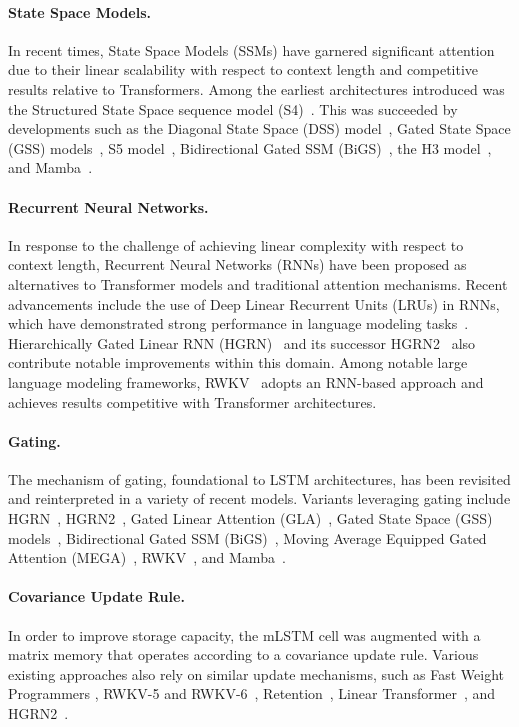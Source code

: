 \paragraph{State Space Models.} In recent times, State Space Models (SSMs) have garnered significant attention due to their linear scalability with respect to context length and competitive results relative to Transformers. Among the earliest architectures introduced was the Structured State Space sequence model (S4)~\citep{Gu:21}. This was succeeded by developments such as the Diagonal State Space (DSS) model~\citep{Gupta:22}, Gated State Space (GSS) models~\citep{Mehta:22}, S5 model~\citep{Smith:22}, Bidirectional Gated SSM (BiGS)~\citep{Wang:22}, the H3 model~\citep{Fu:23}, and Mamba~\citep{Gu:24arxiv}.

\paragraph{Recurrent Neural Networks.} In response to the challenge of achieving linear complexity with respect to context length, Recurrent Neural Networks (RNNs) have been proposed as alternatives to Transformer models and traditional attention mechanisms. Recent advancements include the use of Deep Linear Recurrent Units (LRUs) in RNNs, which have demonstrated strong performance in language modeling tasks~\citep{Orvieto:23, De:24arxiv}. Hierarchically Gated Linear RNN (HGRN)~\citep{Qin:23} and its successor HGRN2~\citep{Qin:24arxiv} also contribute notable improvements within this domain. Among notable large language modeling frameworks, RWKV~\citep{Peng:23arxivshort,Peng:24arxivshort} adopts an RNN-based approach and achieves results competitive with Transformer architectures.

\paragraph{Gating.}
The mechanism of gating, foundational to LSTM architectures, has been revisited and reinterpreted in a variety of recent models. Variants leveraging gating include HGRN~\citep{Qin:23}, HGRN2~\citep{Qin:24arxiv}, Gated Linear Attention (GLA)~\citep{Yang:23arxiv}, Gated State Space (GSS) models~\citep{Mehta:22}, Bidirectional Gated SSM (BiGS)~\citep{Wang:22}, Moving Average Equipped Gated Attention (MEGA)~\citep{Ma:22}, RWKV~\citep{Peng:23arxivshort}, and Mamba~\citep{Gu:24arxiv}.

\paragraph{Covariance Update Rule.} In order to improve storage capacity, the mLSTM cell was augmented with a matrix memory that operates according to a covariance update rule. Various existing approaches also rely on similar update mechanisms, such as Fast Weight Programmers \citep{Schmidhuber:92ncfastweights,Schlag:21}, RWKV-5 and RWKV-6~\citep{Peng:24arxivshort}, Retention~\citep{Sun:23arxiv}, Linear Transformer~\citep{Katharopoulos:20}, and HGRN2~\citep{Qin:24arxiv}.

